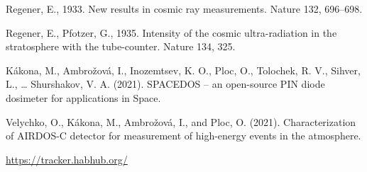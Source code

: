 \documentclass{Rpd}
\begin{document}
\begin{thebibliography}{99.}
 Regener, E., 1933. New results in cosmic ray measurements. Nature 132, 696–698.

 Regener, E., Pfotzer, G., 1935. Intensity of the cosmic ultra-radiation in the stratosphere with the tube-counter. Nature 134, 325.

 Kákona, M., Ambrožová, I., Inozemtsev, K. O., Ploc, O., Tolochek, R. V., Sihver, L., … Shurshakov, V. A. (2021). SPACEDOS – an open-source PIN diode dosimeter for applications in Space.

 Velychko, O., Kákona, M., Ambrožová, I., and Ploc, O. (2021). Characterization of AIRDOS-C detector for measurement of high-energy events in the atmosphere.

 \url{https://tracker.habhub.org/}


\end{thebibliography}
\end{document}
